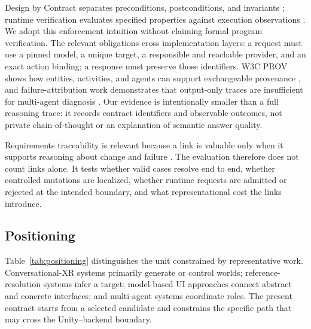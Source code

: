 Design by Contract separates preconditions, postconditions, and invariants
\cite{meyer1992contract}; runtime verification evaluates specified properties
against execution observations \cite{leucker2009runtime}.  We adopt this
enforcement intuition without claiming formal program verification.
The relevant obligations cross implementation layers: a request must use a
pinned model, a unique target, a responsible and reachable provider, and an
exact action binding; a response must preserve those identifiers.  W3C PROV
shows how entities, activities, and agents can support exchangeable provenance
\cite{lebo2013provo}, and failure-attribution work demonstrates that output-only
traces are insufficient for multi-agent diagnosis \cite{chen2026elephant}.
Our evidence is intentionally smaller than a full reasoning trace: it records
contract identifiers and observable outcomes, not private chain-of-thought or
an explanation of semantic answer quality.

Requirements traceability is relevant because a link is valuable only when it
supports reasoning about change and failure
\cite{gotel1994traceability,maeder2015benefit}.  The evaluation therefore does
not count links alone.  It tests whether valid cases resolve end to end,
whether controlled mutations are localized, whether runtime requests are
admitted or rejected at the intended boundary, and what representational cost
the links introduce.

\subsection{Positioning}

Table~\ref{tab:positioning} distinguishes the unit constrained by representative
work.  Conversational-XR systems primarily generate or control worlds;
reference-resolution systems infer a target; model-based UI approaches connect
abstract and concrete interfaces; and multi-agent systems coordinate roles.
The present contract starts from a selected candidate and constrains the
specific path that may cross the Unity--backend boundary.

